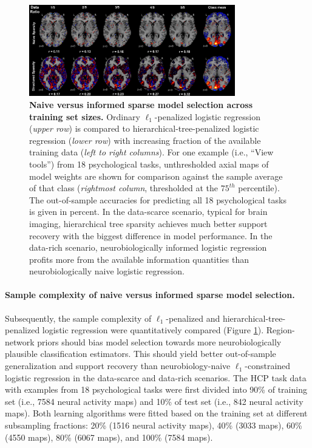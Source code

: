 \documentclass{article}
\begin{document}
\begin{figure}
\begin{centering}
\includegraphics[width=0.80\textwidth]{../figures/dataratio_trans.pdf}
\caption{\textbf{Naive versus informed sparse model selection
across training set sizes.}
Ordinary $\ell_1$-penalized logistic regression
(\textit{upper row})
is compared
to hierarchical-tree-penalized logistic regression
(\textit{lower row})
with increasing fraction
of the available training data (\textit{left to right columns}).
For one example (i.e., ``View tools'') from 18 psychological tasks,
unthresholded axial maps of model weights
are shown for comparison against
the sample average of that class
(\textit{rightmost column}, thresholded at the $75^{th}$ percentile).
The out-of-sample accuracies for predicting all 18 psychological tasks
is given in percent.
%
In the data-scarce scenario,
typical for brain imaging,
hierarchical tree sparsity achieves much
better support recovery with the biggest difference
in model performance.
%
In the data-rich scenario,
neurobiologically informed logistic regression
profits more from the available information quantities than
neurobiologically naive logistic regression.
}
\label{fig_dataratio}
\end{centering}
\end{figure}



\paragraph{Sample complexity of naive versus informed sparse model selection.}
Subsequently, the sample complexity of
$\ell_1$-penalized and hierarchical-tree-penalized logistic regression
were quantitatively compared (Figure \ref{fig_dataratio}).
Region-network priors should bias model selection towards more
neurobiologically plausible classification estimators.
This should yield better out-of-sample generalization and
support recovery than
neurobiology-naive $\ell_1$-constrained logistic regression
in the data-scarce and data-rich scenarios.
%
The HCP task data with examples from 18
psychological tasks were first divided into
90\% of training set (i.e., 7584 neural activity maps) and
10\% of test set (i.e., 842 neural activity maps).
Both learning algorithms were fitted based on the
training set at different subsampling fractions:
20\% (1516 neural activity maps),
40\% (3033 maps),
60\% (4550 maps),
80\% (6067 maps), and
100\% (7584 maps).
\end{document}
